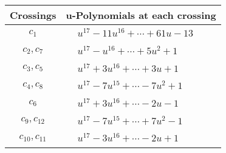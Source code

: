 \documentclass[1p]{elsarticle_modified}
\theoremstyle{definition}
\begin{document}
\begin{tabular}{m{50pt}|m{274pt}}
Crossings & \hspace{64pt}u-Polynomials at each crossing \\
\hline $$\begin{aligned}c_{1}\end{aligned}$$&$\begin{aligned}
&u^{17}-11 u^{16}+\cdots+61 u-13
\end{aligned}$\\
\hline $$\begin{aligned}c_{2},c_{7}\end{aligned}$$&$\begin{aligned}
&u^{17}- u^{16}+\cdots+5 u^2+1
\end{aligned}$\\
\hline $$\begin{aligned}c_{3},c_{5}\end{aligned}$$&$\begin{aligned}
&u^{17}+3 u^{16}+\cdots+3 u+1
\end{aligned}$\\
\hline $$\begin{aligned}c_{4},c_{8}\end{aligned}$$&$\begin{aligned}
&u^{17}-7 u^{15}+\cdots-7 u^2+1
\end{aligned}$\\
\hline $$\begin{aligned}c_{6}\end{aligned}$$&$\begin{aligned}
&u^{17}+3 u^{16}+\cdots-2 u-1
\end{aligned}$\\
\hline $$\begin{aligned}c_{9},c_{12}\end{aligned}$$&$\begin{aligned}
&u^{17}-7 u^{15}+\cdots+7 u^2-1
\end{aligned}$\\
\hline $$\begin{aligned}c_{10},c_{11}\end{aligned}$$&$\begin{aligned}
&u^{17}-3 u^{16}+\cdots-2 u+1
\end{aligned}$\\
\hline
\end{tabular}\\~\\
\newpage\renewcommand{\arraystretch}{1}
\end{document}
